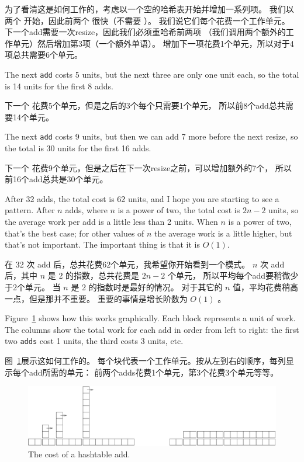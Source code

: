 为了看清这是如何工作的，考虑以一个空的哈希表开始并增加一系列项。
我们以两个  开始，因此前两个  很快（不需要 ）。
我们说它们每个花费一个工作单元。
下一个add需要一次resize，因此我们必须重哈希前两项
（我们调用两个额外的工作单元）然后增加第3项（一个额外单语）。
增加下一项花费1个单元，所以对于4项总共需要6个单元。

The next {\tt add} costs 5 units, but the next three
are only one unit each, so the total is 14 units for the
first 8 adds.

下一个  花费5个单元，但是之后的3个每个只需要1个单元，
所以前8个add总共需要14个单元。

The next {\tt add} costs 9 units, but then we can add 7 more
before the next resize, so the total is 30 units for the
first 16 adds.

下一个  花费9个单元，但是之后在下一次resize之前，可以增加额外的7个，
所以前16个add总共是30个单元。

After 32 adds, the total cost is 62 units, and I hope you are starting
to see a pattern.  After $n$ adds, where $n$ is a power of two, the
total cost is $2n-2$ units, so the average work per add is
a little less than 2 units.  When $n$ is a power of two, that's
the best case; for other values of $n$ the average work is a little
higher, but that's not important.  The important thing is that it
is $O(1)$.

在 32 次 add 后，总共花费62个单元，我希望你开始看到一个模式。
$n$ 次 add 后，其中 $n$ 是 2 的指数，总共花费是 $2n-2$ 个单元，
所以平均每个add要稍微少于2个单元。
当 $n$ 是 2 的指数时是最好的情况。
对于其它的 $n$ 值，平均花费稍高一点，但是那并不重要。
重要的事情是增长阶数为 $O(1)$ 。

Figure~\ref{fig.hash} shows how this works graphically.  Each
block represents a unit of work.  The columns show the total
work for each add in order from left to right: the first two
{\tt adds} cost 1 units, the third costs 3 units, etc.

图~\ref{fig.hash}展示这如何工作的。
每个块代表一个工作单元。按从左到右的顺序，每列显示每个add所需的单元：
前两个adds花费1个单元，第3个花费3个单元等等。

\begin{figure}
\centerline{\includegraphics[width=5.5in]{../source/figs/towers.pdf}}
\caption{The cost of a hashtable add.\label{fig.hash}}
\end{figure}

